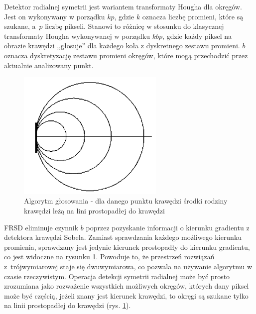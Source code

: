 Detektor radialnej symetrii jest wariantem transformaty Hougha dla okręgów. 
Jest on wykonywany w porządku $kp$, gdzie $k$ oznacza liczbę promieni, które są szukane, a~$p$ liczbę pikseli. Stanowi to różnicę w stosunku do klasycznej transformaty Hougha wykonywanej w porządku $kbp$, gdzie każdy piksel na obrazie krawędzi ,,głosuje'' dla każdego koła z dyskretnego zestawu promieni. $b$ oznacza dyskretyzację zestawu promieni okręgów, które mogą przechodzić przez aktualnie analizowany punkt.

\begin{figure}
  \centering
  \includegraphics[width=7cm]{img/fsrd1.png}
  \caption{Algorytm głosowania - dla danego punktu krawędzi środki rodziny krawędzi leżą na lini prostopadłej do krawędzi\cite{T2}}
  \label{fig:frsd1}
\end{figure}

FRSD eliminuje czynnik $b$ poprzez pozyskanie informacji o kierunku gradientu z detektora krawędzi Sobela.
Zamiast sprawdzania każdego możliwego kierunku promienia, sprawdzany jest jedynie kierunek prostopadły do kierunku gradientu, co jest widoczne na rysunku \ref{fig:frsd1}. 
Powoduje to, że przestrzeń rozwiązań z~trójwymiarowej staje się dwuwymiarowa, co pozwala na używanie algorytmu w czasie rzeczywistym. 
Operacja detekcji symetrii radialnej może być prosto zrozumiana jako rozważenie wszystkich możliwych okręgów, których dany piksel może być częścią, jeżeli znany jest kierunek krawędzi, to okręgi są szukane tylko na linii prostopadłej do krawędzi (rys. \ref{fig:frsd1}). %




